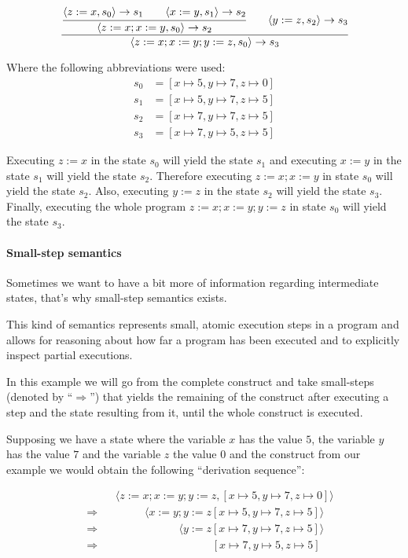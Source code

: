 \begin{equation*}
\cfrac{
  \cfrac{\langle z:=x, s_{0}\rangle \rightarrow s_{1} \qquad \langle x:=y, s_{1} \rangle \rightarrow s_{2}}
    {\langle z:=x; x:=y, s_{0} \rangle \rightarrow s_{2}}
  \qquad
  \langle y:=z, s_{2} \rangle \rightarrow s_{3}
  }
  {\langle z:=x; x:=y; y:=z, s_{0} \rangle \rightarrow s_{3}}
\end{equation*}

Where the following abbreviations were used:
\begin{align*}
s_{0} &= [x\mapsto5, y\mapsto7, z\mapsto0]\\
s_{1} &= [x\mapsto5, y\mapsto7, z\mapsto5]\\
s_{2} &= [x\mapsto7, y\mapsto7, z\mapsto5]\\
s_{3} &= [x\mapsto7, y\mapsto5, z\mapsto5]
\end{align*}

Executing $z:=x$ in the state $s_{0}$ will yield the state $s_{1}$ and executing $x:=y$ in the state $s_{1}$ will yield the state $s_{2}$.
Therefore executing $z:=x; x:=y$ in state $s_{0}$ will yield the state $s_{2}$.
Also, executing $y:=z$ in the state $s_{2}$ will yield the state $s_{3}$.
Finally, executing the whole program $z:=x; x:=y; y:=z$ in state $s_{0}$ will yield the state $s_{3}$.

\paragraph{Small-step semantics}

Sometimes we want to have a bit more of information regarding intermediate states, that's why small-step semantics exists.

This kind of semantics represents small, atomic execution steps in a program and allows for reasoning about how far a program has been executed and to explicitly inspect partial executions.~\parencite{nipkow}

In this example we will go from the complete construct and take small-steps (denoted by ``$\Rightarrow$'') that yields the remaining of the construct after executing a step and the state resulting from it, until the whole construct is executed.

Supposing we have a state where the variable $x$ has the value $5$, the variable $y$ has the value $7$ and the variable $z$ the value $0$ and the construct from our example we would obtain the following \enquote{derivation sequence}:

\begin{equation*}
\begin{split}
& \phantom{\Rightarrow} \phantom{=} \langle z:=x; x:=y; y:=z, [x\mapsto5, y\mapsto7, z\mapsto0]\rangle\\
& \Rightarrow \phantom{=} \phantom{z:=x} \langle x:=y; y:=z [x\mapsto5, y\mapsto7, z\mapsto5]\rangle\\
& \Rightarrow \phantom{=} \phantom{z:=x; x:=y} \langle y:=z [x\mapsto7, y\mapsto7, z\mapsto5]\rangle\\
& \Rightarrow \phantom{=} \phantom{z:=x; x:=y; y:=z} [x\mapsto7, y\mapsto5, z\mapsto5]
\end{split}
\end{equation*}

